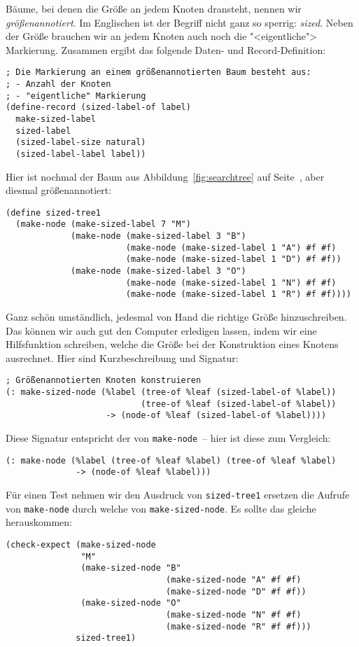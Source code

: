 Bäume, bei denen die Größe an jedem Knoten dransteht, nennen wir
\textit{größenannotiert}.  Im Englischen ist der Begriff
nicht ganz so sperrig: \textit{sized}.  Neben der Größe brauchen wir
an jedem Knoten auch noch die "<eigentliche"> Markierung.  Zusammen
ergibt das folgende Daten- und Record-Definition:
%
\begin{lstlisting}
; Die Markierung an einem größenannotierten Baum besteht aus:
; - Anzahl der Knoten
; - "eigentliche" Markierung
(define-record (sized-label-of label)
  make-sized-label
  sized-label
  (sized-label-size natural)
  (sized-label-label label))
\end{lstlisting}
%
Hier ist nochmal der Baum aus Abbildung~\ref{fig:searchtree} auf
Seite~\pageref{fig:searchtree}, aber diesmal größenannotiert:
%
\begin{lstlisting}
(define sized-tree1
  (make-node (make-sized-label 7 "M")
             (make-node (make-sized-label 3 "B")
                        (make-node (make-sized-label 1 "A") #f #f)
                        (make-node (make-sized-label 1 "D") #f #f))
             (make-node (make-sized-label 3 "O")
                        (make-node (make-sized-label 1 "N") #f #f)
                        (make-node (make-sized-label 1 "R") #f #f))))
\end{lstlisting}
%
Ganz schön umständlich, jedesmal von Hand die richtige Größe
hinzuschreiben.  Das können wir auch gut den Computer erledigen
lassen, indem wir eine Hilfsfunktion schreiben, welche die Größe bei
der Konstruktion eines Knotens ausrechnet.  Hier sind Kurzbeschreibung
und Signatur:
%
\begin{lstlisting}
; Größenannotierten Knoten konstruieren
(: make-sized-node (%label (tree-of %leaf (sized-label-of %label))
                           (tree-of %leaf (sized-label-of %label))
                    -> (node-of %leaf (sized-label-of %label))))
\end{lstlisting}
%
Diese Signatur entspricht der von \lstinline{make-node}~-- hier ist
diese zum Vergleich:
%
\begin{lstlisting}
(: make-node (%label (tree-of %leaf %label) (tree-of %leaf %label)
              -> (node-of %leaf %label)))
\end{lstlisting}
%
Für einen Test nehmen wir den Ausdruck von \lstinline{sized-tree1}
ersetzen die Aufrufe von \lstinline{make-node} durch welche von
\lstinline{make-sized-node}.  Es sollte das gleiche herauskommen:
%
\begin{lstlisting}
(check-expect (make-sized-node
               "M"
               (make-sized-node "B"
                                (make-sized-node "A" #f #f)
                                (make-sized-node "D" #f #f))
               (make-sized-node "O"
                                (make-sized-node "N" #f #f)
                                (make-sized-node "R" #f #f)))
              sized-tree1)
\end{lstlisting}
